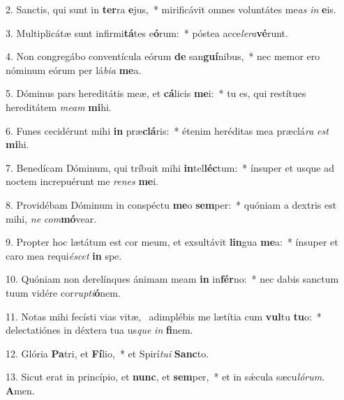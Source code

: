 2. Sanctis, qui sunt in \textbf{ter}ra \textbf{e}jus,~*  mirificávit omnes voluntátes me\textit{as} \textit{in} \textbf{e}is.\

3. Multiplicátæ sunt infirmi\textbf{tá}tes e\textbf{ó}rum:~*  póstea acce\textit{le}\textit{ra}\textbf{vé}runt.\

4. Non congregábo conventícula eórum \textbf{de} san\textbf{guí}nibus,~*  nec memor ero nóminum eórum per lá\textit{bi}\textit{a} \textbf{me}a.\

5. Dóminus pars hereditátis meæ, et \textbf{cá}licis \textbf{me}i:~*  tu es, qui restítues hereditátem \textit{me}\textit{am} \textbf{mi}hi.\

6. Funes cecidérunt mihi \textbf{in} præ\textbf{clá}ris:~*  étenim heréditas mea præclá\textit{ra} \textit{est} \textbf{mi}hi.\

7. Benedícam Dóminum, qui tríbuit mihi \textbf{in}tel\textbf{léc}tum:~*  ínsuper et usque ad noctem increpuérunt me \textit{re}\textit{nes} \textbf{me}i.\

8. Providébam Dóminum in conspéctu \textbf{me}o \textbf{sem}per:~*  quóniam a dextris est mihi, \textit{ne} \textit{com}\textbf{mó}vear.\

9. Propter hoc lætátum est cor meum, et exsultávit \textbf{lin}gua \textbf{me}a:~*  ínsuper et caro mea requi\textit{é}\textit{scet} \textbf{in} spe.\

10. Quóniam non derelínques ánimam meam \textbf{in} in\textbf{fér}no:~*  nec dabis sanctum tuum vidére cor\textit{rup}\textit{ti}\textbf{ó}nem.\

11. Notas mihi fecísti vias vitæ, \dag\  adimplébis me lætítia cum \textbf{vul}tu \textbf{tu}o:~*  delectatiónes in déxtera tua us\textit{que} \textit{in} \textbf{fi}nem.\

12. Glória \textbf{Pa}tri, et \textbf{Fí}lio,~*  et Spirí\textit{tu}\textit{i} \textbf{Sanc}to.\

13. Sicut erat in princípio, et \textbf{nunc}, et \textbf{sem}per,~*  et in sǽcula sæcu\textit{ló}\textit{rum}. \textbf{A}men.\

